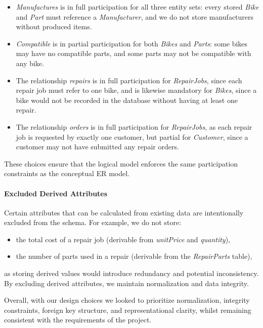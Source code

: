 \documentclass[dtu]{dtuarticle}
\begin{document}
\begin{itemize}
    \item \textit{Manufactures} is in full participation for all three entity sets: every stored \textit{Bike} and \textit{Part} must reference a \textit{Manufacturer}, and we do not store manufacturers without produced items.
    \item \textit{Compatible} is in partial participation for both \textit{Bikes} and \textit{Parts}: some bikes may have no compatible parts, and some parts may not be compatible with any bike.
    \item The relationship \textit{repairs} is in full participation for \textit{RepairJobs}, since each repair job must refer to one bike, and is likewise mandatory for \textit{Bikes}, since a bike would not be recorded in the database without having at least one repair.
    \item The relationship \textit{orders} is in full participation for \textit{RepairJobs}, as each repair job is requested by exactly one customer, but partial for \textit{Customer}, since a customer may not have submitted any repair orders.
\end{itemize}

These choices ensure that the logical model enforces the same participation constraints as the conceptual ER model.

\paragraph{Excluded Derived Attributes}
Certain attributes that can be calculated from existing data are intentionally excluded from the schema. For example, we do not store:
\begin{itemize}
    \item the total cost of a repair job (derivable from \textit{unitPrice} and \textit{quantity}),
    \item the number of parts used in a repair (derivable from the \textit{RepairParts} table),
\end{itemize}
as storing derived values would introduce redundancy and potential inconsistency. By excluding derived attributes, we maintain normalization and data integrity.

Overall, with our design choices we looked to prioritize normalization, integrity constraints, foreign key structure, and representational clarity, whilst remaining consistent with the requirements of the project.

\end{document}
